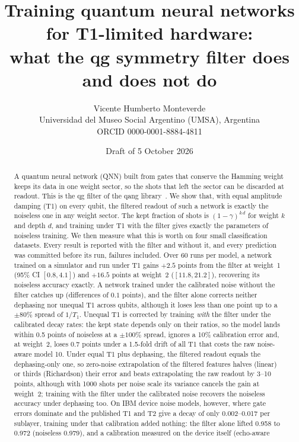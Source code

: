 \documentclass[11pt]{article}
\title{Training quantum neural networks for T1-limited hardware:\\
what the qg symmetry filter does and does not do}
\author{Vicente Humberto Monteverde\\
\small Universidad del Museo Social Argentino (UMSA), Argentina\\
\small ORCID 0000-0001-8884-4811}
\date{\small Draft of 5 October 2026}
\begin{document}
\sloppy
\maketitle

\begin{abstract}
A quantum neural network (QNN) built from gates that conserve the Hamming weight keeps its data in one
weight sector, so the shots that left the sector can be discarded at readout. This is the qg filter of
the qang library~\cite{monteverde2026qang,monteverde2026witness}. We show that, with equal amplitude damping
(T1) on every qubit, the filtered readout of such a network is exactly the noiseless one in any weight
sector. The kept fraction of shots is $(1-\gamma)^{k\,d}$ for weight $k$ and depth $d$, and training under
T1 with the filter gives exactly the parameters of noiseless training. We then measure what this is worth
on four small classification datasets. Every result is reported with the filter and without it, and every
prediction was committed before its run, failures included. Over 60 runs per model, a network trained on a
simulator and run under T1 gains $+2.5$ points from the filter at weight~1 (95\% CI $[0.8,4.1]$) and
$+16.5$ points at weight~2 ($[11.8,21.2]$), recovering its noiseless accuracy exactly. A network trained
under the calibrated noise without the filter catches up (differences of $0.1$ points), and the filter
alone corrects neither dephasing nor unequal T1 across qubits, although it loses less than one point up
to a $\pm80\%$ spread of $1/T_1$. Unequal T1 is corrected by training \emph{with} the filter under the
calibrated decay rates: the kept state depends only on their ratios, so the model lands within 0.5 points of
noiseless at a $\pm100\%$ spread, ignores a 10\% calibration error and, at weight~2, loses 0.7 points under a
1.5-fold drift of all T1 that costs the raw noise-aware model 10. Under equal T1 plus dephasing, the filtered readout
equals the dephasing-only one, so zero-noise extrapolation of the filtered features halves (linear) or thirds
(Richardson) their error and beats extrapolating the raw readout by 3--10 points, although with 1000 shots per noise
scale its variance cancels the gain at weight~2; training with the filter under the calibrated noise recovers the
noiseless accuracy under dephasing too. On IBM device noise models, however, where gate errors dominate and the
published T1 and T2 give a decay of only 0.002--0.017 per sublayer, training under that calibration added nothing:
the filter alone lifted 0.958 to 0.972 (noiseless 0.979), and a calibration measured on the device itself (echo-aware

\end{abstract}
\end{document}

